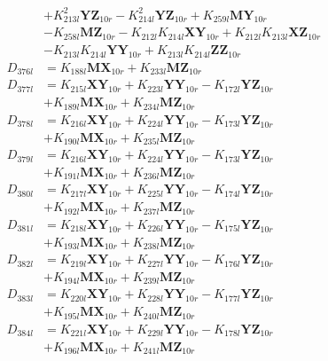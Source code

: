 \begin{multicols}{2}
\begin{align}
&+ K_{213l}^2\mathbf{YZ}_{10r} - K_{214l}^2\mathbf{YZ}_{10r} + K_{259l}\mathbf{MY}_{10r}  \nonumber \\
&- K_{258l}\mathbf{MZ}_{10r} - K_{212l}K_{214l}\mathbf{XY}_{10r} + K_{212l}K_{213l}\mathbf{XZ}_{10r}  \nonumber \\
&- K_{213l}K_{214l}\mathbf{YY}_{10r} + K_{213l}K_{214l}\mathbf{ZZ}_{10r} \nonumber \\
D_{376l} &= K_{188l}\mathbf{MX}_{10r} + K_{233l}\mathbf{MZ}_{10r} \nonumber \\
D_{377l} &= K_{215l}\mathbf{XY}_{10r} + K_{223l}\mathbf{YY}_{10r} - K_{172l}\mathbf{YZ}_{10r}  \nonumber \\
&+ K_{189l}\mathbf{MX}_{10r} + K_{234l}\mathbf{MZ}_{10r} \nonumber \\
D_{378l} &= K_{216l}\mathbf{XY}_{10r} + K_{224l}\mathbf{YY}_{10r} - K_{173l}\mathbf{YZ}_{10r}  \nonumber \\
&+ K_{190l}\mathbf{MX}_{10r} + K_{235l}\mathbf{MZ}_{10r} \nonumber \\
D_{379l} &= K_{216l}\mathbf{XY}_{10r} + K_{224l}\mathbf{YY}_{10r} - K_{173l}\mathbf{YZ}_{10r}  \nonumber \\
&+ K_{191l}\mathbf{MX}_{10r} + K_{236l}\mathbf{MZ}_{10r} \nonumber \\
D_{380l} &= K_{217l}\mathbf{XY}_{10r} + K_{225l}\mathbf{YY}_{10r} - K_{174l}\mathbf{YZ}_{10r}  \nonumber \\
&+ K_{192l}\mathbf{MX}_{10r} + K_{237l}\mathbf{MZ}_{10r} \nonumber \\
D_{381l} &= K_{218l}\mathbf{XY}_{10r} + K_{226l}\mathbf{YY}_{10r} - K_{175l}\mathbf{YZ}_{10r}  \nonumber \\
&+ K_{193l}\mathbf{MX}_{10r} + K_{238l}\mathbf{MZ}_{10r} \nonumber \\
D_{382l} &= K_{219l}\mathbf{XY}_{10r} + K_{227l}\mathbf{YY}_{10r} - K_{176l}\mathbf{YZ}_{10r}  \nonumber \\
&+ K_{194l}\mathbf{MX}_{10r} + K_{239l}\mathbf{MZ}_{10r} \nonumber \\
D_{383l} &= K_{220l}\mathbf{XY}_{10r} + K_{228l}\mathbf{YY}_{10r} - K_{177l}\mathbf{YZ}_{10r}  \nonumber \\
&+ K_{195l}\mathbf{MX}_{10r} + K_{240l}\mathbf{MZ}_{10r} \nonumber \\
D_{384l} &= K_{221l}\mathbf{XY}_{10r} + K_{229l}\mathbf{YY}_{10r} - K_{178l}\mathbf{YZ}_{10r}  \nonumber \\
&+ K_{196l}\mathbf{MX}_{10r} + K_{241l}\mathbf{MZ}_{10r} \nonumber \\

\end{align}
\end{multicols}
